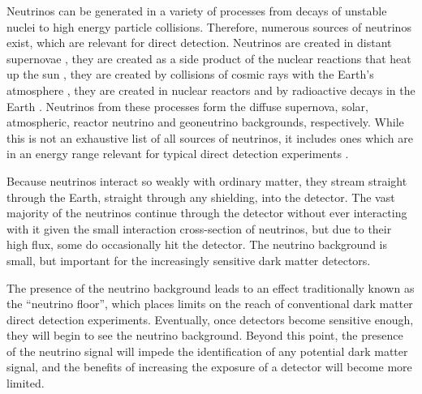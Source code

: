 \documentclass[b5paper, 10pt, twoside]{book}
\begin{document}
Neutrinos can be generated in a variety of processes from decays of unstable nuclei to high energy particle collisions. Therefore, numerous sources of neutrinos exist, which are relevant for direct detection. Neutrinos are created in distant supernovae \parencite{Beacom2010}, they are created as a side product of the nuclear reactions that heat up the sun \parencites{BergstromEtAl2016, OrebiGann2021}, they are created by collisions of cosmic rays with the Earth's atmosphere \parencite{BattistoniEtAl2005}, they are created in nuclear reactors \parencites{MuellerEtAl2011, MaEtAl2013} and by radioactive decays in the Earth \parencites{LudhovaZavatarelli2013, HuangEtAl2013}. Neutrinos from these processes form the diffuse supernova, solar, atmospheric, reactor neutrino and geoneutrino backgrounds, respectively. While this is not an exhaustive list of all sources of neutrinos, it includes ones which are in an energy range relevant for typical direct detection experiments \parencite{VitaglianoTamborraRaffelt2020}.

Because neutrinos interact so weakly with ordinary matter, they stream straight through the Earth, straight through any shielding, into the detector. The vast majority of the neutrinos continue through the detector without ever interacting with it given the small interaction cross-section of neutrinos, but due to their high flux, some do occasionally hit the detector. The neutrino background is small, but important for the increasingly sensitive dark matter detectors.

The presence of the neutrino background leads to an effect traditionally known as the ``neutrino floor'', which places limits on the reach of conventional dark matter direct detection experiments. Eventually, once detectors become sensitive enough, they will begin to see the neutrino background. Beyond this point, the presence of the neutrino signal will impede the identification of any potential dark matter signal, and the benefits of increasing the exposure of a detector will become more limited.
\end{document}
